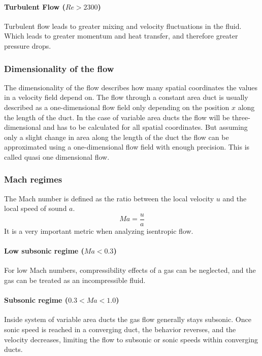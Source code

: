 \paragraph{Turbulent Flow (\(Re > 2300\))}

	Turbulent flow leads to greater mixing and velocity fluctuations in the fluid.
	Which leads to greater momentum and heat transfer, and therefore greater pressure drops. 

\subsubsection{Dimensionality of the flow}

	The dimensionality of the flow describes how many spatial coordinates the values in a velocity field depend on.
	The flow through a constant area duct is usually described as a one-dimensional flow field only depending on the position $x$ along the length of the duct.
	In the case of variable area ducts the flow will be three-dimensional and has to be calculated for all spatial coordinates.
	But assuming only a slight change in area along the length of the duct the flow can be approximated using a one-dimensional flow field with enough precision.
	This is called quasi one dimensional flow. \cite{anderson2021modern}

\newpage

\subsubsection{Mach regimes}

	The Mach number is defined as the ratio between the local velocity $u$ and the local speed of sound $a$.
	$$
		Ma = \frac{u}{a}
	$$
	It is a very important metric when analyzing isentropic flow.

\paragraph{Low subsonic regime (\(Ma < 0.3\))}

	For low Mach numbers, compressibility effects of a gas can be neglected, and the gas can be treated as an incompressible fluid.

\paragraph{Subsonic regime (\(0.3 < Ma < 1.0\))} 

	Inside system of variable area ducts the gas flow generally stays subsonic.
	Once sonic speed is reached in a converging duct, the behavior reverses, and the velocity decreases, limiting the flow to subsonic or sonic speeds within converging ducts.\\
	
